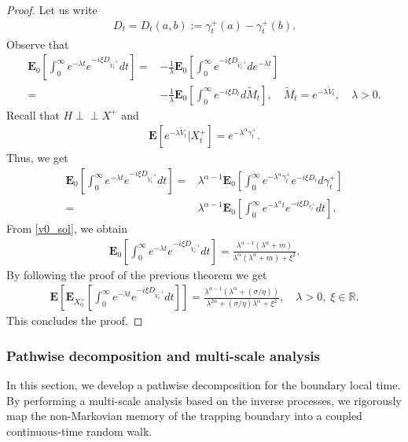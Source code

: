 \documentclass[10pt,a4paper]{article}
\numberwithin{equation}{section}
\newcommand{\indep}{\perp \! \! \! \perp}
\theoremstyle{plain}
\theoremstyle{remark}
\begin{document}
\begin{proof}
Let us write
\begin{align*}
D_t = D_t (a,b) := \gamma^+_t(a) - \gamma^+_t(b).
\end{align*}
Observe that
\begin{align*}
\mathbf{E}_0\left[ \int_0^\infty e^{-\lambda t} e^{-i\xi D_{\tilde{V}^{-1}_t}} dt \right] 
= & - \frac{1}{\lambda} \mathbf{E}_0\left[ \int_0^\infty  e^{-i\xi D_{\bar{V}^{-1}_t}} de^{-\lambda t} \right]\\
= & - \frac{1}{\lambda} \mathbf{E}_0\left[ \int_0^\infty  e^{-i\xi D_t} d \tilde{M}_t \right], \quad \tilde{M}_t = e^{-\lambda \tilde{V}_t}, \quad \lambda>0.
\end{align*}
Recall that $H \indep X^+$ and 
\begin{align*}
\mathbf{E}[e^{-\lambda \tilde{V}_t} | X^+_t] = e^{-\lambda^\alpha \gamma^+_t}.
\end{align*}
Thus, we get
\begin{align*}
\mathbf{E}_0\left[ \int_0^\infty e^{-\lambda t} e^{-i\xi D_{\tilde{V}^{-1}_t}} dt \right] 
= & \lambda^{\alpha - 1} \mathbf{E}_0\left[ \int_0^\infty e^{-\lambda^\alpha  \gamma^+_t} e^{-i\xi D_t} d \gamma^+_t \right]\\
= & \lambda^{\alpha - 1} \mathbf{E}_0\left[ \int_0^\infty e^{-\lambda^\alpha t} e^{-i\xi D_{r^+_t}} dt \right].
\end{align*}
From \eqref{v0_sol}, we obtain
\begin{align*}
\mathbf{E}_0\left[ \int_0^\infty e^{-\lambda t} e^{-i\xi D_{\tilde{V}^{-1}_t}} dt \right] 
= \frac{\lambda^{\alpha -1} (\lambda^\alpha + m)}{\lambda^\alpha (\lambda^\alpha + m) + \xi^2}.
\end{align*}
By following the proof of the previous theorem we get
\begin{align*}
\mathbf{E} \left[ \mathbf{E}_{X^+_0} \left[ \int_0^\infty e^{-\lambda t} e^{-i\xi D_{\tilde{V}^{-1}_t}} dt \right] \right] = \frac{\lambda^{\alpha -1} (\lambda^\alpha + (\sigma/\eta))}{\lambda^{2\alpha} + (\sigma/\eta) \lambda^\alpha + \xi^2}, \quad \lambda>0,\; \xi \in \mathbb{R}.
\end{align*}
This concludes the proof.
\end{proof}




\subsubsection{Pathwise decomposition and multi-scale analysis}
\label{sec:Path}
In this section, we develop a pathwise decomposition for the boundary local time. By performing a multi-scale analysis based on the inverse processes, we rigorously map the non-Markovian memory of the trapping boundary into a coupled continuous-time random walk.\\
\end{document}
